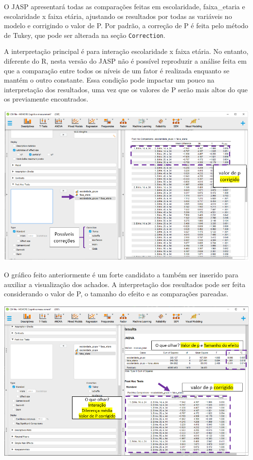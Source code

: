 \documentclass[
]{book}
\begin{document}
O JASP apresentará todas as comparações feitas em escolaridade, faixa\_etaria e escolaridade x faixa etária, ajustando os resultados por todas as variáveis no modelo e corrigindo o valor de P. Por padrão, a correção de P é feita pelo método de Tukey, que pode ser alterada na seção \texttt{Correction}.

A interpretação principal é para interação escolaridade x faixa etária. No entanto, diferente do R, nesta versão do JASP não é possível reproduzir a análise feita em que a comparação entre todos os níveis de um fator é realizada enquanto se mantém o outro constante. Essa condição pode impactar um pouco na interpretação dos resultados, uma vez que os valores de P serão mais altos do que os previamente encontrados.

\includegraphics{./img/cap_anova_fatorial_posthoc3.png}

O gráfico feito anteriormente é um forte candidato a também ser inserido para auxiliar a visualização dos achados. A interpretação dos resultados pode ser feita considerando o valor de P, o tamanho do efeito e as comparações pareadas.

\includegraphics{./img/cap_anova_fatorial_posthoc4.png}
\end{document}
